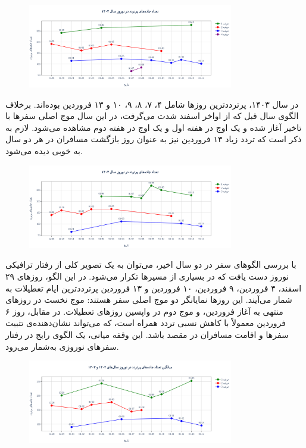 \documentclass[a4paper, 12pt]{article}
\begin{document}
\begin{figure}[htbp]
    \centering
    \includegraphics[width=0.8\textwidth]{pics/peaks/cluster1402.png}
\end{figure}

در سال ۱۴۰۳، پرترددترین روزها شامل ۴، ۷، ۸، ۹، ۱۰ و ۱۳ فروردین بوده‌اند. برخلاف الگوی سال قبل که از اواخر اسفند شدت می‌گرفت، در این سال موج اصلی سفرها با تاخیر آغاز شده و یک اوج در هفته اول و یک اوج در هفته دوم مشاهده می‌شود. لازم به ذکر است که تردد زیاد ۱۳ فروردین نیز به عنوان روز بازگشت مسافران در هر دو سال به خوبی دیده می‌شود.


\begin{figure}[htbp]
    \centering
    \includegraphics[width=0.8\textwidth]{pics/peaks/cluster1403.png}
\end{figure}

با بررسی الگوهای سفر در دو سال اخیر، می‌توان به یک تصویر کلی از رفتار ترافیکی نوروز دست یافت که در بسیاری از مسیرها تکرار می‌شود. در این الگو، روزهای ۲۹ اسفند، ۴ فروردین، ۹ فروردین، ۱۰ فروردین و ۱۳ فروردین پرترددترین ایام تعطیلات به شمار می‌آیند. این روزها نمایانگر دو موج اصلی سفر هستند: موج نخست در روزهای منتهی به آغاز فروردین، و موج دوم در واپسین روزهای تعطیلات. در مقابل، روز ۶ فروردین معمولاً با کاهش نسبی تردد همراه است، که می‌تواند نشان‌دهنده‌ی تثبیت سفرها و اقامت مسافران در مقصد باشد. این وقفه میانی، یک الگوی رایج در رفتار سفرهای نوروزی به‌شمار می‌رود.

\begin{figure}[H]
    \centering
    \includegraphics[width=0.8\textwidth]{pics/peaks/clustermean.png}
\end{figure}
\end{document}
